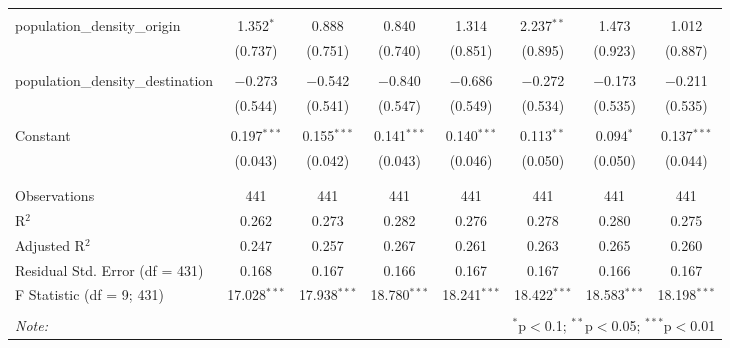 \begin{table}[!htbp]
\begin{tabular}{@{\extracolsep{5pt}}lccccccc}
  & & & & & & & \\ 
 population\_density\_origin & 1.352$^{*}$ & 0.888 & 0.840 & 1.314 & 2.237$^{**}$ & 1.473 & 1.012 \\ 
  & (0.737) & (0.751) & (0.740) & (0.851) & (0.895) & (0.923) & (0.887) \\ 
  & & & & & & & \\ 
 population\_density\_destination & $-$0.273 & $-$0.542 & $-$0.840 & $-$0.686 & $-$0.272 & $-$0.173 & $-$0.211 \\ 
  & (0.544) & (0.541) & (0.547) & (0.549) & (0.534) & (0.535) & (0.535) \\ 
  & & & & & & & \\ 
 Constant & 0.197$^{***}$ & 0.155$^{***}$ & 0.141$^{***}$ & 0.140$^{***}$ & 0.113$^{**}$ & 0.094$^{*}$ & 0.137$^{***}$ \\ 
  & (0.043) & (0.042) & (0.043) & (0.046) & (0.050) & (0.050) & (0.044) \\ 
  & & & & & & & \\ 
\hline \\[-1.8ex] 
Observations & 441 & 441 & 441 & 441 & 441 & 441 & 441 \\ 
R$^{2}$ & 0.262 & 0.273 & 0.282 & 0.276 & 0.278 & 0.280 & 0.275 \\ 
Adjusted R$^{2}$ & 0.247 & 0.257 & 0.267 & 0.261 & 0.263 & 0.265 & 0.260 \\ 
Residual Std. Error (df = 431) & 0.168 & 0.167 & 0.166 & 0.167 & 0.167 & 0.166 & 0.167 \\ 
F Statistic (df = 9; 431) & 17.028$^{***}$ & 17.938$^{***}$ & 18.780$^{***}$ & 18.241$^{***}$ & 18.422$^{***}$ & 18.583$^{***}$ & 18.198$^{***}$ \\ 
\hline 
\hline \\[-1.8ex] 
\textit{Note:}  & \multicolumn{7}{r}{$^{*}$p$<$0.1; $^{**}$p$<$0.05; $^{***}$p$<$0.01} \\ 
\end{tabular} 
\end{table} 
